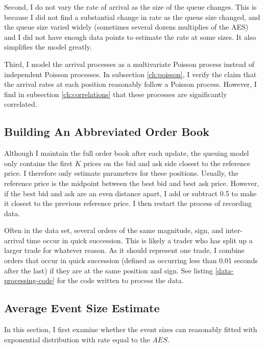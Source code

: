 Second, I do not vary the rate of arrival as the size of the queue changes. This is because I did not find a substantial change in rate as the queue size changed, and the queue size varied widely (sometimes several dozens multiplies of the AES) and I did not have enough data points to estimate the rate at some sizes. It also simplifies the model greatly.

Third, I model the arrival processes as a multivariate Poisson process instead of independent Poisson processes. In subsection \ref{ch:poisson}, I verify the claim that the arrival rates at each position reasonably follow a Poisson process. However, I find in subsection \ref{ch:correlations} that these processes are significantly correlated.

\subsection{Building An Abbreviated Order Book}
Although I maintain the full order book after each update, the queuing model only contains the first $K$ prices on the bid and ask side closest to the reference price. I therefore only estimate parameters for these positions. Usually, the reference price is the midpoint between the best bid and best ask price. However, if the best bid and ask are an even distance apart, I add or subtract 0.5 to make it closest to the previous reference price. I then restart the process of recording data.

Often in the data set, several orders of the same magnitude, sign, and inter-arrival time occur in quick succession. This is likely a trader who has split up a larger trade for whatever reason. As it should represent one trade, I combine orders that occur in quick succession (defined as occurring less than 0.01 seconds after the last) if they are at the same position and sign. See listing \ref{data-processing-code} for the code written to process the data.

\subsection{Average Event Size Estimate}\label{ch:AES}
In this section, I first examine whether the event sizes can reasonably fitted with exponential distribution with rate equal to the $AES$. 

